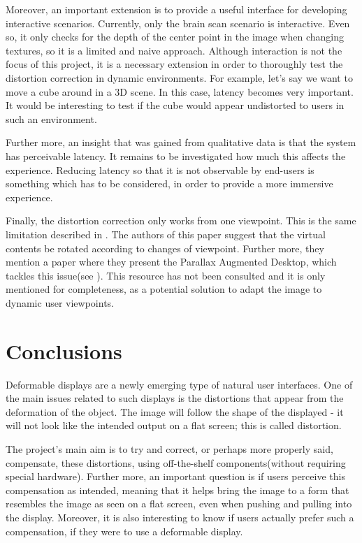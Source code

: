 \documentclass[]{article}
\begin{document}
Moreover, an important extension is to provide a useful interface for developing interactive scenarios. Currently, only the brain scan scenario is interactive. Even so, it only checks for the depth of the center point in the image when changing textures, so it is a limited and naive approach. Although interaction is not the focus of this project, it is a necessary extension in order to thoroughly test the distortion correction in dynamic environments. For example, let's say we want to move a cube around in a 3D scene. In this case, latency becomes very important. It would be interesting to test if the cube would appear undistorted to users in such an environment. 

Further more, an insight that was gained from qualitative data is that the system has perceivable latency. It remains to be investigated how much this affects the experience. Reducing latency so that it is not observable by end-users is something which has to be considered, in order to provide a more immersive experience.

Finally, the distortion correction only works from one viewpoint. This is the same limitation described in \cite{watanabe08}. The authors of this paper suggest that the virtual contents be rotated according to changes of viewpoint. Further more, they mention a paper where they present the Parallax Augmented Desktop, which tackles this issue(see \cite{reynolds08}). This resource has not been consulted and it is only mentioned for completeness, as a potential solution to  adapt the image to dynamic user viewpoints.

\clearpage
\section{Conclusions}

Deformable displays are a newly emerging type of natural user interfaces. One of the main issues related to such displays is the distortions that appear from the deformation of the object. The image will follow the shape of the displayed - it will not look like the intended output on a flat screen; this is called distortion. 

The project's main aim is to try and correct, or perhaps more properly said, compensate, these distortions, using off-the-shelf components(without requiring special hardware). Further more, an important question is if users perceive this compensation as intended, meaning that it helps bring the image to a form that resembles the image as seen on a flat screen, even when pushing and pulling into the display. Moreover, it is also interesting to know if users actually prefer such a compensation, if they were to use a deformable display.
\end{document}

